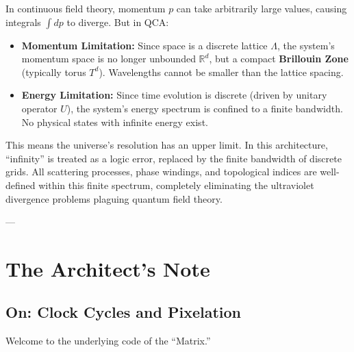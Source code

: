 In continuous field theory, momentum \textbf{$p$} can take arbitrarily large values, causing integrals \textbf{$\int dp$} to diverge. But in QCA:

\begin{itemize}
\item \textbf{Momentum Limitation:} Since space is a discrete lattice \textbf{$\Lambda$}, the system's momentum space is no longer unbounded \textbf{$\mathbb{R}^d$}, but a compact \textbf{Brillouin Zone} (typically torus \textbf{$T^d$}). Wavelengths cannot be smaller than the lattice spacing.

\item \textbf{Energy Limitation:} Since time evolution is discrete (driven by unitary operator \textbf{$U$}), the system's energy spectrum is confined to a finite bandwidth. No physical states with infinite energy exist.
\end{itemize}

This means the universe's resolution has an upper limit. In this architecture, ``infinity'' is treated as a logic error, replaced by the finite bandwidth of discrete grids. All scattering processes, phase windings, and topological indices are well-defined within this finite spectrum, completely eliminating the ultraviolet divergence problems plaguing quantum field theory.

---

\section{The Architect's Note}

\subsection{On: Clock Cycles and Pixelation}

Welcome to the underlying code of the ``Matrix.''

